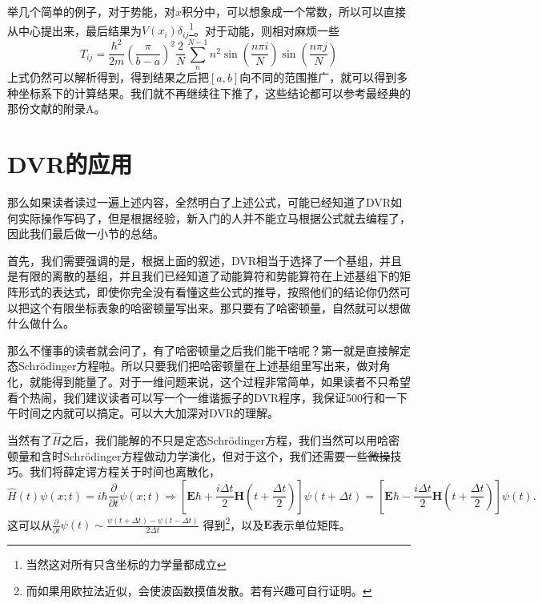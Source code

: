 \documentclass[12pt,a4paper,openany,twoside]{book}
\numberwithin{equation}{section}
\newcommand{\sch}{Schr\"odinger}
\begin{document}
        举几个简单的例子，对于势能，对$x$积分中，可以想象成一个常数，所以可以直接从中心提出来，最后结果为$V(x_i)\delta_{ij}$\footnote{当然这对所有只含坐标的力学量都成立}。对于动能，则相对麻烦一些
        \begin{equation}
          T_{ij}=\frac{\hbar^2}{2m}\left(\frac{\pi}{b-a}\right)^2\frac{2}{N}\sum_n^{N-1}n^2\sin\left(\frac{n\pi i}{N}\right)\sin\left(\frac{n\pi j}{N}\right)
        \end{equation}
        上式仍然可以解析得到，得到结果之后把$[a,b]$向不同的范围推广，就可以得到多种坐标系下的计算结果。我们就不再继续往下推了，这些结论都可以参考最经典的那份文献\cite{colbert1992novel}的附录A。
      \section{DVR的应用}
        那么如果读者读过一遍上述内容，全然明白了上述公式，可能已经知道了DVR如何实际操作写码了，但是根据经验，新入门的人并不能立马根据公式就去编程了，因此我们最后做一小节的总结。

        首先，我们需要强调的是，根据上面的叙述，DVR相当于选择了一个基组，并且是有限的离散的基组，并且我们已经知道了动能算符和势能算符在上述基组下的矩阵形式的表达式，即使你完全没有看懂这些公式的推导，按照他们的结论你仍然可以把这个有限坐标表象的哈密顿量写出来。那只要有了哈密顿量，自然就可以想做什么做什么。
        
        那么不懂事的读者就会问了，有了哈密顿量之后我们能干啥呢？第一就是直接解定态\sch 方程啦。所以只要我们把哈密顿量在上述基组里写出来，做对角化，就能得到能量了。对于一维问题来说，这个过程非常简单，如果读者不只希望看个热闹，我们建议读者可以写一个一维谐振子的DVR程序，我保证500行和一下午时间之内就可以搞定。可以大大加深对DVR的理解。

        当然有了$\hat{H}$之后，我们能解的不只是定态\sch 方程，我们当然可以用哈密顿量和含时\sch 方程做动力学演化，但对于这个，我们还需要一些\sout{微操}技巧。我们将薛定谔方程关于时间也离散化，
        \[
      	  \hat{H}(t) \psi(x;t) = i \hbar \frac{\partial }{\partial t} \psi(x;t) \Rightarrow \left[\mathbf{E} \hbar + \frac{i \Delta t}{2} \mathbf{H}(t+\frac{\Delta t}{2})\right] \psi(t+ \Delta t) = \left[\mathbf{E} \hbar - \frac{i \Delta t}{2} \mathbf{H} (t+\frac{\Delta t}{2})\right] \psi(t)  
        .\] 
        这可以从$\frac{\partial }{\partial t} \psi(t) \sim \frac{\psi(t+ \Delta t) - \psi(t-\Delta t)}{2 \Delta t}$ 得到\footnote{而如果用欧拉法近似，会使波函数摸值发散。若有兴趣可自行证明。}，以及$\mathbf{E}$表示单位矩阵。
\end{document}
